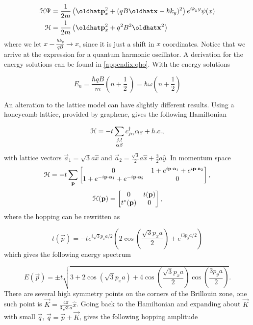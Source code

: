 \begin{align}
  \ham\Psi &= \dfrac{1}{2m} \left( \op{p}_x^2 + (qB \op{x} - \hbar k_y)^2 \right)e^{ik_y y} \psi(x) \nonumber \\
  \ham & = \dfrac{1}{2m} \left( \op{p}_x^2 + q^2 B^2 \op{x}^2 \right)
\end{align}
where we let $x - \tfrac{\hbar k_y}{qB} \rightarrow x$, since it is just a shift in $x$ coordinates.
Notice that we arrive at the expression for a quantum harmonic oscillator.
A derivation for the energy solutions can be found in \ref{appendix:qho}.
With the energy solutions

\begin{equation}
  E_n = \dfrac{\hbar q B}{m} \left(n+\dfrac{1}{2}\ \right) = \hbar \omega \left(n + \dfrac{1}{2} \right)
\end{equation}

An alteration to the lattice model can have slightly different results.
Using a honeycomb lattice, provided by graphene, gives the following Hamiltonian

\begin{equation}
  \mathcal{H} = -t \sum_{\substack{j, l \\ \alpha \beta}} c^{\dagger}_{j\alpha} c_{l\beta} + h.c.,
\end{equation}
with lattice vectors $\vec{a}_1 = \sqrt{3} a \hat{x}$ and $\vec{a}_2 = \tfrac{\sqrt{3}}{2} a \hat{x} + \tfrac{3}{2} a \hat{y}$.
In momentum space
\[
  \mathcal{H} = -t \sum_{\mathbf{p}}
  \begin{bmatrix}
    0 & 1 + e^{i\mathbf{p}\cdot \mathbf{a}_1 } + e^{i \mathbf{p}\cdot \mathbf{a}_2} \\
    1 + e^{-i\mathbf{p}\cdot \mathbf{a}_1 } + e^{-i \mathbf{p}\cdot \mathbf{a}_2} & 0
  \end{bmatrix},
\]
\[
  \mathcal{H}(\mathbf{p}) =
  \begin{bmatrix}
    0 & t(\mathbf{p}) \\
    t^*(\mathbf{p}) & 0
  \end{bmatrix},
\]
where the hopping can be rewritten as

\begin{equation}
  t(\vec{p}) = -t e^{i\sqrt{3} p_x a / 2} \left( 2\cos{\left( \dfrac{\sqrt{3} p_x a }{ 2 } \right)} + e^{i 3 p_y a /2 } \right)
\end{equation}
which gives the following energy spectrum

\begin{equation}
  E(\vec{p}) = \pm t \sqrt{3 + 2\cos{\left(\sqrt{3}p_x a\right)} + 4\cos{\left(\dfrac{\sqrt{3}p_x a}{2}\right)}\cos{\left(\dfrac{3p_y a}{2}\right)} }.
\end{equation}
There are several high symmetry points on the corners of the Brillouin zone, one such point is $\vec{K} = \tfrac{4\pi}{3\sqrt{3}a} \hat{x} $.
Going back to the Hamiltonian and expanding about $\vec{K}$ with small $\vec{q}$, $\vec{q} = \vec{p} + \vec{K}$, gives the following hopping amplitude

